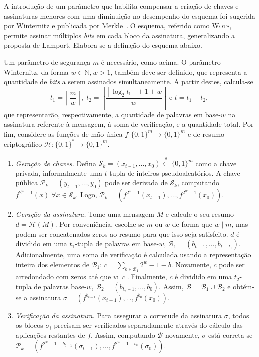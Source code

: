 \documentclass[12pt]{report}
\newcommand{\pk}{$\mathcal{P}_k$}
\newcommand{\sk}{$\mathcal{S}_k$}
\newcommand{\binwds}[1]{\{0, 1\}^{#1}}
\newcommand{\length}[1]{\vert #1 \vert}
\begin{document}
A introdução de um parâmetro que habilita compensar a criação de chaves e
assinaturas menores com uma diminuição no desempenho do esquema foi sugerida
por Winternitz e publicada por Merkle~\cite{Merkle:1989:CDS:118209.118230}.
O esquema, referido como \textsc{Wots}, permite assinar múltiplos \emph{bits} em cada bloco da assinatura,
generalizando a proposta de Lamport. Elabora-se a definição do esquema abaixo.

Um parâmetro de segurança $m$ é necessário, como acima. O parâmetro
Winternitz, da forma $w \in \mathbb{N}, w > 1$, também deve ser definido, que
representa a quantidade de \emph{bits} a serem assinados simultaneamente.
A partir destes, calcula-se
    $$t_1 = \left\lceil \frac{m}{w} \right\rceil, \; t_2 = \left\lceil 
    \frac{\left\lfloor \log_2 t_1 \right\rfloor + 1 + w}{w} \right\rceil \text{ e }
    t = t_1 + t_2,$$
que representarão, respectivamente, a quantidade de palavras em base-$w$ na assinatura referente à mensagem, à soma de verificação, e a quantidade total.
Por fim, considere as funções de mão única
$f : \binwds{m} \longrightarrow \binwds{m}$ e de resumo criptográfico
$\mathcal{H} : \binwds{*} \longrightarrow \binwds{m}$.

\begin{enumerate}

    \item[] \emph{Geração de chaves.} Defina $\text{\sk{}} = (x_{t-1}, \dots, x_0) \stackrel{\$}{\longleftarrow} \binwds{m}$ como a chave privada, informalmente uma $t$-tupla de inteiros pseudoaleatórios. A chave pública $\text{\pk{}} = (y_{t-1}, \dots, y_0)$ pode ser derivada de \sk{}, computando $f^{2^{w}-1}(x) \; \forall x \in  \text{\sk{}}$. Logo, $\text{\pk{}} = (f^{2^{w}-1}(x_{t-1}), \dots, f^{2^{w}-1}(x_0))$.

    \item[] \emph{Geração da assinatura.} Tome uma mensagem $M$ e calcule o seu resumo $d = \mathcal{H}(M)$. Por conveniência, escolhe-se $m$ ou $w$ de forma que $w \mid m$, mas podem ser concatenados zeros ao resumo para que isso seja satisfeito. $d$ é dividido em uma $t_1$-tupla de palavras em base-$w$, $\mathcal{B}_1 = (b_{t-1}, \dots, b_{t-t_1})$. 
    Adicionalmente, uma soma de verificação é calculada usando a representação inteira dos elementos de $\mathcal{B}_1$: $c = \sum_{b \in \mathcal{B}_1} 2^w - 1 - b$. Novamente, $c$ pode ser arredondado com zeros até que $w \mid \length{c}$. Finalmente, $c$ é dividido em uma $t_2$-tupla de palavras base-$w$, $\mathcal{B}_2 = (b_{t_2-1}, \dots, b_0)$. Assim, $\mathcal{B} = \mathcal{B}_1 \cup \mathcal{B}_2$ e obtém-se a assinatura $\sigma = (f^{b_{t-1}}(x_{t-1}), \dots, f^{b_0}(x_0)).$
    
    \item[] \emph{Verificação da assinatura.} Para assegurar a corretude da assinatura $\sigma$, todos os blocos $\sigma_i$ precisam ser verificados separadamente através do cálculo das aplicações restantes de $f$. Assim, computando $\mathcal{B}$ novamente, $\sigma$ está correta se $\text{\pk{}} = (f^{2^w - 1 - b_{t-1}}(\sigma_{t-1}), \dots, f^{2^w - 1 - b_0}(\sigma_0))$.
    
\end{enumerate}
\end{document}
